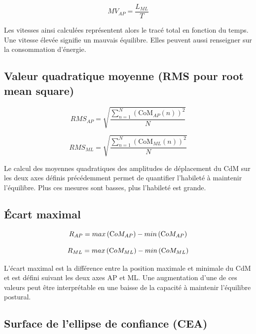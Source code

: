 \begin{equation}
    MV_{AP} = \frac{L_{ML}}{T}  
    \label{eq:MV_ML}    
\end{equation}

Les vitesses ainsi calculées représentent alors le tracé total en fonction du temps. 
Une vitesse élevée signifie un mauvais équilibre. 
Elles peuvent aussi renseigner sur la consommation d'énergie.

\subsection{Valeur quadratique moyenne (RMS pour root mean square)}

\begin{equation}
    RMS_{AP} =\sqrt{  \frac{\sum_{n=1}^{N} \left (\text{CoM}_{AP}(n) \right)^2 }{N}}
    \label{eq:RMS_AP}
\end{equation}

\begin{equation}
    RMS_{ML} =\sqrt{  \frac{\sum_{n=1}^{N} \left (\text{CoM}_{ML}(n) \right)^2 }{N}}
    \label{eq:RMS_ML}
\end{equation}

Le calcul des moyennes quadratiques des amplitudes de déplacement du CdM sur les deux axes définis précédemment permet de quantifier l'habileté à maintenir l'équilibre. 
Plus ces mesures sont basses, plus l'habileté est grande.

\subsection{Écart maximal}

\begin{equation}
  R_{AP}= max \left ( \text CoM_{AP} \right ) - min\left ( \text CoM_{AP} \right ) 
  \label{eq:R_AP}
\end{equation}

\begin{equation}
  R_{ML}= max \left ( \text CoM_{ML} \right ) - min\left ( \text CoM_{ML} \right )   
  \label{eq:R_ML}
\end{equation}


L'écart maximal est la différence entre la position maximale et minimale du CdM et est défini suivant les deux axes AP et ML.
Une augmentation d'une de ces valeurs peut être interprétable en une baisse de la capacité à maintenir l'équilibre postural.

\subsection{Surface de l'ellipse de confiance (CEA)}

